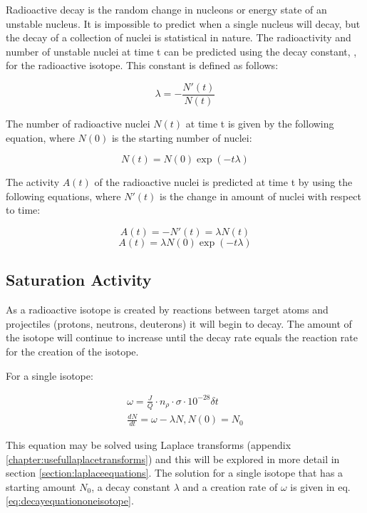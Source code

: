 Radioactive decay is the random change in nucleons or energy state of an unstable nucleus.  It is impossible to predict when a single nucleus will decay, but the decay of a collection of nuclei is statistical in nature.  The radioactivity and number of unstable nuclei at time t can be predicted using the decay constant, \textlambda, for the radioactive isotope.  This constant is defined as follows:

\begin{equation}
\lambda = - \frac{N'(t)}{N(t)}
\end{equation}

The number of radioactive nuclei $N(t)$ at time t is given by the following equation, where $N(0)$ is the starting number of nuclei:

\begin{equation}
N(t) = N(0) \exp(-t \lambda)
\end{equation}

The activity $A(t)$ of the radioactive nuclei is predicted at time t by using the following equations, where $N'(t)$ is the change in amount of nuclei with respect to time:

\begin{equation}
A(t) = -N'(t) = \lambda N(t)
\label{eq:activityofanisotope}
\end{equation}
\begin{equation}
A(t) = \lambda N(0) \exp(-t \lambda)
\end{equation}

\subsection{Saturation Activity}

As a radioactive isotope is created by reactions between target atoms and projectiles (protons, neutrons, deuterons) it will begin to decay.  The amount of the isotope will continue to increase until the decay rate equals the reaction rate for the creation of the isotope.

For a single isotope:

\begin{equation}
\begin{split}
\omega = \frac{J}{Q} \cdot n_{\rho} \cdot \sigma \cdot 10^{-28} \delta t \\
\frac{dN}{dt} = \omega - \lambda N, N(0) = N_0
\end{split}
\end{equation}

This equation may be solved using Laplace transforms (appendix \ref{chapter:usefullaplacetransforms}) and this will be explored in more detail in section \ref{section:laplaceequations}.  The solution for a single isotope that has a starting amount $N_0$, a decay constant $\lambda$ and a creation rate of $\omega$ is given in eq. \ref{eq:decayequationoneisotope}.

